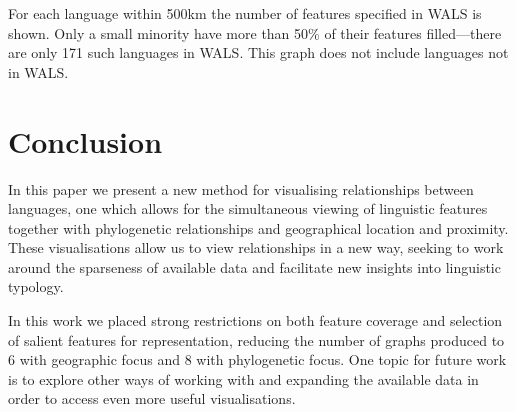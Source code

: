 \documentclass[11pt]{article}
\begin{document}
For each language within 500km the number of features specified in WALS is shown. Only a small minority have more than 50\% of their features filled---there are only 171 such languages in WALS. This graph does not include languages not in WALS. 


\section{Conclusion}
In this paper we present a new method for visualising relationships between languages, one which allows for the simultaneous viewing of linguistic features together with phylogenetic relationships and geographical location and proximity. These visualisations allow us to view relationships in a new way, seeking to work around the sparseness of available data and facilitate new insights into linguistic typology.

In this work we placed strong restrictions on both feature coverage and selection of salient features for representation, reducing the number of graphs produced to 6 with geographic focus and 8 with phylogenetic focus. One topic for future work is to explore other ways of working with and expanding the available data in order to access even more useful visualisations.

\newpage


\end{document}
